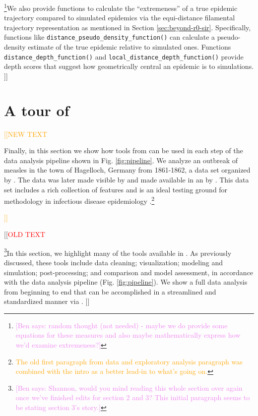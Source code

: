 \documentclass[
  shortnames]{jss}
\begin{document}
\footnote{\textcolor{violet}{[Ben says: random thought (not needed) - maybe we do provide some equations for these measures and also maybe mathematically express how we'd examine extremeness?]}}We
also provide functions to calculate the ``extremeness'' of a true
epidemic trajectory compared to simulated epidemics via the
equi-distance filamental trajectory representation as mentioned in
Section \ref{sec:beyond-r0-sir}. Specifically, functions like
\texttt{distance\_pseudo\_density\_function()} can calculate a
pseudo-density estimate of the true epidemic relative to simulated ones.
Functions \texttt{distance\_depth\_function()} and
\texttt{local\_distance\_depth\_function()} provide depth scores that
suggest how geometrically central an epidemic is to simulations. {]}{]}

\section[Tour]{A tour of }\label{sec:tour}

\textcolor{orange}{[[NEW TEXT}

Finally, in this section we show how tools from  can be
used in each step of the data analysis pipeline shown in Fig.
\ref{fig:pipeline}. We analyze an outbreak of measles in the town of
Hagelloch, Germany from 1861-1862, a data set organized by
\cite{pfeilsticker1863}. The data was later made visible by
\cite{oesterle1992} and made available in an  by
\cite{surveillance2017}. This data set includes a rich collection of
features and is an ideal testing ground for methodology in infectious
disease epidemiology
\cite{Neal2004,britton2011,groendyke2012,becker2016}.\footnote{\textcolor{orange}{The old first paragraph from data and exploratory analysis paragraph was combined with the intro as a better lead-in to what's going on.}}

\textcolor{orange}{]]}

{[}{[}\textcolor{red}{OLD TEXT}

\footnote{\textcolor{violet}{[Ben says: Shannon, would you mind reading this whole section over again once we've finished edits for section 2 and 3? This initial paragraph seems to be stating section 3's story.]}}In
this section, we highlight many of the tools available in
. As previously discussed, these tools include data
cleaning; visualization; modeling and simulation; post-processing; and
comparison and model assessment, in accordance with the data analysis
pipeline (Fig. \ref{fig:pipeline}). We show a full data analysis from
beginning to end that can be accomplished in a streamlined and
standardized manner via . {]}{]}
\end{document}
